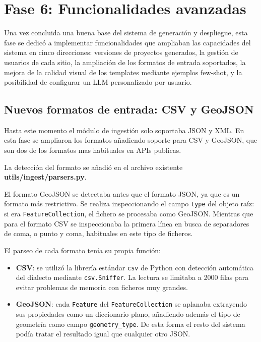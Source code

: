 \section{Fase 6: Funcionalidades avanzadas}
\label{sec:funcionalidades-avanzadas}

Una vez concluida una buena base del sistema de generación y despliegue, 
esta fase se dedicó a implementar funcionalidades que ampliaban las 
capacidades del sistema en cinco direcciones: versiones de proyectos generados, la gestión de usuarios de cada sitio, la ampliación de los formatos de entrada soportados, la mejora de la calidad visual de los templates mediante ejemplos few-shot, y la posibilidad de configurar un LLM personalizado por usuario.

\subsection{Nuevos formatos de entrada: CSV y GeoJSON}
\label{subsec:nuevos-formatos-entrada}

Hasta este momento el módulo de ingestión solo soportaba JSON y XML. En esta fase se ampliaron los formatos añadiendo soporte para CSV y GeoJSON, que son dos de los formatos mas habituales en APIs publicas.

La detección del formato se añadió en el archivo existente \textbf{utils/ingest/parsers.py}. 

El formato GeoJSON se detectaba antes que el formato JSON, ya que es un formato más restrictivo. Se realiza inspeccionando el campo \texttt{type} del objeto raíz: si era \texttt{FeatureCollection}, el fichero se procesaba como GeoJSON. Mientras que para el formato CSV se inspeccionaba la primera línea en busca de separadores de coma, o punto y coma, habituales en este tipo de ficheros.

El parseo de cada formato tenía su propia función:

\begin{itemize}
    \item \textbf{CSV}: se utilizó la librería estándar \texttt{csv} de Python con detección automática del dialecto mediante \texttt{csv.Sniffer}. La lectura se limitaba a 2000 filas para evitar problemas de memoria con ficheros muy grandes.
    \item \textbf{GeoJSON}: cada \texttt{Feature} del \texttt{FeatureCollection} se aplanaba extrayendo sus propiedades como un diccionario plano, añadiendo además el tipo de geometría como campo \texttt{geometry\_type}. De esta forma el resto del sistema podía tratar el resultado igual que cualquier otro JSON.
\end{itemize}

